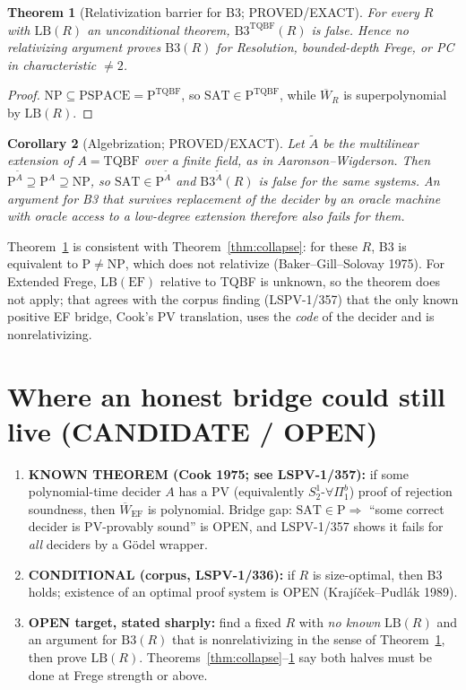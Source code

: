 \documentclass[11pt]{article}
\newtheorem{theorem}{Theorem}
\newtheorem{corollary}[theorem]{Corollary}
\theoremstyle{definition}
\newcommand{\Wbar}{\overline W}
\begin{document}
\begin{theorem}[Relativization barrier for B3; PROVED/EXACT]\label{thm:rel}
For every $R$ with $\mathrm{LB}(R)$ an unconditional theorem, $\mathrm{B3}^{\mathrm{TQBF}}(R)$ is false. Hence no relativizing argument proves $\mathrm{B3}(R)$ for Resolution, bounded-depth Frege, or PC in characteristic $\ne 2$.
\end{theorem}
\begin{proof}
$\mathrm{NP}\subseteq\mathrm{PSPACE}=\mathrm{P}^{\mathrm{TQBF}}$, so $\mathrm{SAT}\in\mathrm{P}^{\mathrm{TQBF}}$, while $\Wbar_R$ is superpolynomial by $\mathrm{LB}(R)$.
\end{proof}

\begin{corollary}[Algebrization; PROVED/EXACT]\label{cor:alg}
Let $\widetilde{A}$ be the multilinear extension of $A=\mathrm{TQBF}$ over a finite field, as in Aaronson--Wigderson. Then $\mathrm{P}^{\widetilde A}\supseteq \mathrm{P}^{A}\supseteq\mathrm{NP}$, so $\mathrm{SAT}\in\mathrm{P}^{\widetilde A}$ and $\mathrm{B3}^{\widetilde A}(R)$ is false for the same systems. An argument for B3 that survives replacement of the decider by an oracle machine with oracle access to a low-degree extension therefore also fails for them.
\end{corollary}
\noindent Theorem~\ref{thm:rel} is consistent with Theorem~\ref{thm:collapse}: for these $R$, B3 is equivalent to $\mathrm{P}\ne\mathrm{NP}$, which does not relativize (Baker--Gill--Solovay 1975). For Extended Frege, $\mathrm{LB}(\mathrm{EF})$ relative to TQBF is unknown, so the theorem does not apply; that agrees with the corpus finding (LSPV-1/357) that the only known positive EF bridge, Cook's PV translation, uses the \emph{code} of the decider and is nonrelativizing.

\section{Where an honest bridge could still live (CANDIDATE / OPEN)}
\begin{enumerate}
\item \textbf{KNOWN THEOREM (Cook 1975; see LSPV-1/357):} if some polynomial-time decider $A$ has a PV (equivalently $S^1_2$-$\forall\Pi^b_1$) proof of rejection soundness, then $\Wbar_{\mathrm{EF}}$ is polynomial. Bridge gap: $\mathrm{SAT}\in\mathrm{P}\Rightarrow$ ``some correct decider is PV-provably sound'' is OPEN, and LSPV-1/357 shows it fails for \emph{all} deciders by a G\"odel wrapper.
\item \textbf{CONDITIONAL (corpus, LSPV-1/336):} if $R$ is size-optimal, then B3 holds; existence of an optimal proof system is OPEN (Kraj\'i\v{c}ek--Pudl\'ak 1989).
\item \textbf{OPEN target, stated sharply:} find a fixed $R$ with \emph{no known} $\mathrm{LB}(R)$ and an argument for $\mathrm{B3}(R)$ that is nonrelativizing in the sense of Theorem~\ref{thm:rel}, then prove $\mathrm{LB}(R)$. Theorems~\ref{thm:collapse}--\ref{thm:rel} say both halves must be done at Frege strength or above.
\end{enumerate}
\end{document}
